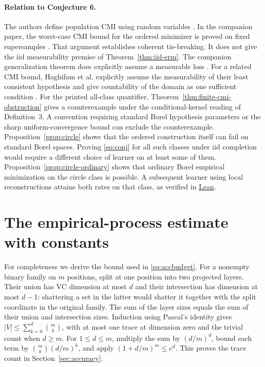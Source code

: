 \documentclass[11pt]{article}
\theoremstyle{definition}\newtheorem{definition}[theorem]{Definition}
\begin{document}
\paragraph{Relation to Conjecture 6.}
The authors define population CMI using random variables
\cite[Definition~3]{problem}. In the companion paper, the worst-case CMI
bound for the ordered minimizer is proved on fixed supersamples
\cite[Theorem~4.12 and Lemmas~4.14--4.15]{framework}. That argument establishes
coherent tie-breaking. It does not give the iid measurability premise of
Theorem~\ref{thm:iid-erm}. The companion generalization theorem does
explicitly assume a measurable loss \cite[Theorem~5.1]{framework}.
For a related CMI bound, Haghifam et al. explicitly assume the measurability
of their least consistent hypothesis and give countability of the domain as
one sufficient condition \cite[Appendix~F, footnote~6]{haghifamfull}.
For the printed all-class quantifier, Theorem~\ref{thm:finite-cmi-obstruction}
gives a counterexample under the conditional-kernel reading of
Definition~3. A convention requiring standard Borel hypothesis parameters
or the sharp uniform-convergence bound can exclude the counterexample.
Proposition~\ref{prop:circle} shows that the
ordered construction itself can fail on standard Borel spaces. Proving
\eqref{eq:conj} for all such classes under iid completion would require
a different choice of learner on at least some of them. Proposition~\ref{prop:circle-ordinary}
shows that ordinary Borel empirical minimization on the circle class is
possible. A subsequent learner using local reconstructions attains both
rates on that class, as verified in
\href{https://github.com/1337isnot1337/solved-conjectures/blob/414c3aeef6c520cb12487180e9d20606660a8165/lean/Conjectures/AgnosticVC/OrbitIidRates.lean}{Lean}.

\appendix
\section{The empirical-process estimate with constants}\label{app:emp}
For completeness we derive the bound used in \eqref{eq:accbudget}.
For a nonempty binary family on $m$ positions, split at one position into
two projected layers. Their union has VC dimension at most $d$ and their
intersection has dimension at most $d-1$: shattering a set in the latter
would shatter it together with the split coordinate in the original family.
The sum of the layer sizes equals the sum of their union and intersection
sizes. Induction using Pascal's identity gives
$|V|\le\sum_{k=0}^d\binom{m}{k}$, with at most one trace at dimension zero
and the trivial count when $d\ge m$. For $1\le d\le m$, multiply the sum
by $(d/m)^d$, bound each term by $\binom{m}{k}(d/m)^k$, and apply
$(1+d/m)^m\le e^d$. This proves the trace count in Section~\ref{sec:accuracy}.
\end{document}
